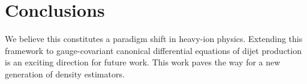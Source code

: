\section{Conclusions}\label{sec:conclusions}

We believe this constitutes a paradigm shift in heavy-ion physics.
Extending this framework to gauge-covariant canonical differential
equations of dijet production is an exciting direction for future work.
This work paves the way for a new generation of density estimators.

